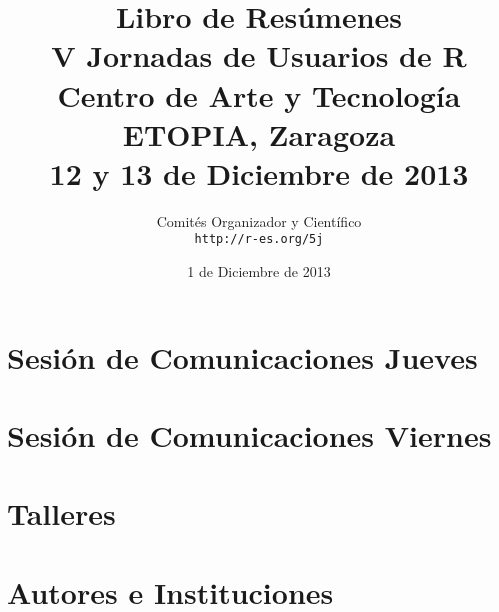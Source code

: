\documentclass[a4paper, 12pt]{memoir}
\begin{document}
\frontmatter

\begin{titlingpage}

  \title{
    \Large{Libro de Resúmenes}\\
    \Huge{V Jornadas de Usuarios de R}\\
    \vspace{15pt}
    \Large{Centro de Arte y Tecnología ETOPIA, Zaragoza}\\
    \large{12 y 13 de Diciembre de 2013}\\
  }

  \author{
    Comités Organizador y Científico\\
    \texttt{http://r-es.org/5j}}

  \date{1 de Diciembre de 2013}

  \maketitle


\end{titlingpage}




\cleardoublepage

\tableofcontents

\cleardoublepage



\mainmatter

\renewcommand{\partname}{}

\part{Sesión de Comunicaciones Jueves}
\label{part:comunicacionesI}



\part{Sesión de Comunicaciones Viernes}
\label{part:comunicacionesII}




\part{Talleres}
\label{part:talleres}





\backmatter


\part{Autores e Instituciones}

\pagestyle{index}

\renewcommand{\indexname}{Índice de autores}

\printindex

\renewcommand{\indexname}{Índice de Instituciones}

\printindex[inst]
\end{document}
